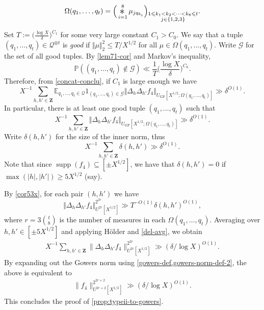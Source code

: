 \documentclass[11pt,reqno]{amsart}
\numberwithin{equation}{section}
\theoremstyle{definition}
\theoremstyle{remark}
\newcommand{\snorm}[1]{\lVert#1\rVert}
\newcommand{\mb}{\mathbb}
\newcommand{\mc}{\mathcal}
\newcommand{\on}{\operatorname}
\renewcommand{\le}{\leqslant}
\renewcommand{\ge}{\geqslant}
\newcommand\Z{\mathbf{Z}}
\newcommand\E{\mb{E}}
\renewcommand\P{\mb{P}}
\newcommand\GP{\operatorname{GP}}
\newcommand{\conv}{\mathop{\scalebox{1.5}{\raisebox{-0.2ex}{$\ast$}}}}
\begin{document}
\[ \Omega(q_1,\dots, q_t) = \Big( \conv_{i = 1}^{8}  \mu_{j q_{k_i}}\Big)_{\substack{1 \le k_1 < k_2 <\cdots < k_{8} \le t\\j \in \{1,2,3\}}}.\]

Set $T := \big(\frac{\log X}{\delta}\big)^{C_1}$ for some very large constant $C_1 > C_0$. We say that a tuple $(q_1,\dots, q_t) \in \mc{Q}^{\otimes t}$ is \emph{good} if $\Vert \mu \Vert_2^2 \le T/X^{1/2}$ for all $\mu \in \Omega(q_1,\dots, q_t)$. Write $\mc{G}$ for the set of all good tuples. By \cref{lem71-cor} and Markov's inequality, 
\[ \P((q_1,\dots, q_t) \notin \mc{G}) \ll \frac{1}{T} \Big(\frac{\log X}{\delta}\Big)^{C_0}.\] Therefore, from \cref{concat-conclu}, if $C_1$ is large enough we have
\begin{equation}\label{concat-conclu-2} X^{-1}\sum_{h,h'\in \Z} \E_{q_1,\dots, q_t \in \mc{Q}} 1_{(q_1,\dots, q_t) \in \mc{G}} \Vert \Delta_{h} \Delta_{h'} f_4 \Vert_{U_{\GP}[X^{1/2}; \Omega(q_1,\dots, q_t)]} \gg \delta^{O(1)} .\end{equation}
In particular, there is at least one good tuple $(q_1,\dots, q_t)$ such that 
\begin{equation}\label{concat-conclu-3} X^{-1}\sum_{h,h'\in \Z} 
\Vert \Delta_{h} \Delta_{h'} f_4 \Vert_{U_{\GP}[X^{1/2}; \Omega(q_1,\dots, q_t)]} \gg \delta^{O(1)}.\end{equation}
Write $\delta(h, h')$ for the size of the inner norm, thus
\begin{equation}\label{del-avg} X^{-1}\sum_{h,h'\in \Z} \delta(h, h') \gg \delta^{O(1)}.\end{equation}
Note that since $\on{supp}(f_4)\subseteq [\pm X^{1/2}]$, we have that $\delta(h,h') = 0$ if $\max(|h|,|h'|)\ge 5X^{1/2}$ (say). 

By \cref{cor53x}, for each pair $(h, h')$ we have
\[\Vert \Delta_{h} \Delta_{h'} f_4 \Vert^{2^{2r}}_{U^{2r}[X^{1/2}]} \gg T^{-O(1)}\delta(h, h')^{O(1)}, \] where $r = 3 \binom{t}{8}$ is the number of measures in each $\Omega(q_1,\dots, q_t)$.
Averaging over $h, h'\in [\pm 5X^{1/2}]$ and applying H\"older and \cref{del-avg}, we obtain
\begin{align*}
X^{-1}\sum_{h,h'\in \Z} \snorm{\Delta_{h} \Delta_{h'} f_4}^{2^{2r}}_{U^{2r}[X^{1/2}]}\gg (\delta/\log X)^{O(1)}.
\end{align*}
By expanding out the Gowers norm using \cref{gowers-def,gowers-norm-def-2}, the above is equivalent to 
\begin{align*}
\snorm{f_4}^{2^{2r+2}}_{U^{2r+2}[X^{1/2}]}\gg (\delta/\log X)^{O(1)}.
\end{align*}
This concludes the proof of \cref{prop:typeii-to-gowers}.
\end{document}
